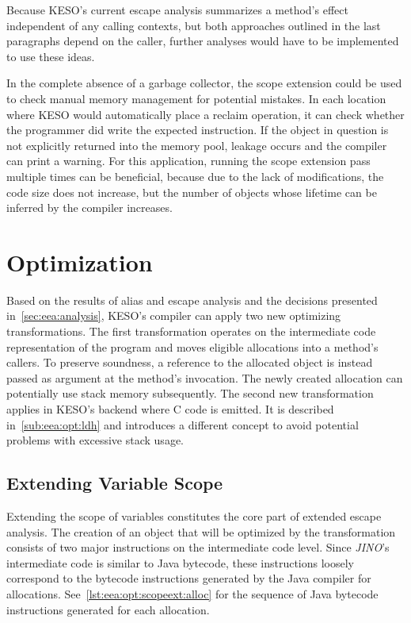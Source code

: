 			Because KESO's current escape analysis summarizes a method's effect independent of any calling contexts, but both
			approaches outlined in the last paragraphs depend on the caller, further analyses would have to be implemented to
			use these ideas.

			In the complete absence of a garbage collector, the scope extension could be used to check manual memory
			management for potential mistakes. In each location where KESO would automatically place a reclaim operation, it
			can check whether the programmer did write the expected instruction. If the object in question is not explicitly
			returned into the memory pool, leakage occurs and the compiler can print a warning. For this application, running
			the scope extension pass multiple times can be beneficial, because due to the lack of modifications, the code size
			does not increase, but the number of objects whose lifetime can be inferred by the compiler increases.

	\section{Optimization}
		\label{sec:eea:opt}
		Based on the results of alias and escape analysis and the decisions presented in~\cref{sec:eea:analysis}, KESO's
		compiler can apply two new optimizing transformations. The first transformation operates on the intermediate code
		representation of the program and moves eligible allocations into a method's callers. To preserve soundness,
		a reference to the allocated object is instead passed as argument at the method's invocation. The newly created
		allocation can potentially use stack memory subsequently. The second new transformation applies in KESO's backend
		where C code is emitted. It is described in~\cref{sub:eea:opt:ldh} and introduces a different concept to avoid
		potential problems with excessive stack usage.

		\subsection{Extending Variable Scope}
			\label{sub:eea:opt:scopeext}
			Extending the scope of variables constitutes the core part of extended escape analysis. The creation of an object
			that will be optimized by the transformation consists of two major instructions on the intermediate code level.
			Since \emph{JINO}'s intermediate code is similar to Java bytecode, these instructions loosely correspond to the
			bytecode instructions generated by the Java compiler for allocations. See~\cref{lst:eea:opt:scopeext:alloc} for
			the sequence of Java bytecode instructions generated for each allocation.

